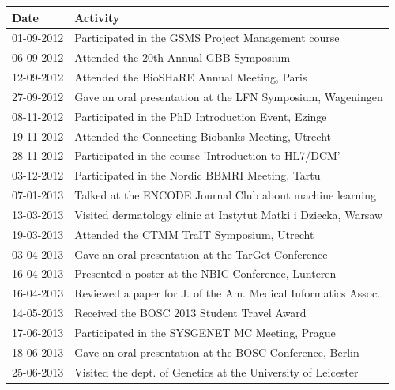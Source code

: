 \begin{appendices}
\begin{table}
\footnotesize
\begin{tabulary}{\linewidth}{LL}
  Date & Activity \\
  \hline
  \rule{0pt}{2.5ex}\mbox{01-09-2012} & Participated in the GSMS Project Management course \\
  \rule{0pt}{2.5ex}\mbox{06-09-2012} & Attended the 20th Annual GBB Symposium \\
  \rule{0pt}{2.5ex}\mbox{12-09-2012} & Attended the BioSHaRE Annual Meeting, Paris \\
  \rule{0pt}{2.5ex}\mbox{27-09-2012} & Gave an oral presentation at the LFN Symposium, Wageningen \\
  \rule{0pt}{2.5ex}\mbox{08-11-2012} & Participated in the PhD Introduction Event, Ezinge \\
  \rule{0pt}{2.5ex}\mbox{19-11-2012} & Attended the Connecting Biobanks Meeting, Utrecht \\
  \rule{0pt}{2.5ex}\mbox{28-11-2012} & Participated in the course 'Introduction to HL7/DCM' \\
  \rule{0pt}{2.5ex}\mbox{03-12-2012} & Participated in the Nordic BBMRI Meeting, Tartu \\
  \rule{0pt}{2.5ex}\mbox{07-01-2013} & Talked at the ENCODE Journal Club about machine learning\\
  \rule{0pt}{2.5ex}\mbox{13-03-2013} & Visited dermatology clinic at Instytut Matki i Dziecka, Warsaw \\
  \rule{0pt}{2.5ex}\mbox{19-03-2013} & Attended the CTMM TraIT Symposium, Utrecht \\
  \rule{0pt}{2.5ex}\mbox{03-04-2013} & Gave an oral presentation at the TarGet Conference \\
  \rule{0pt}{2.5ex}\mbox{16-04-2013} & Presented a poster at the NBIC Conference, Lunteren \\
  \rule{0pt}{2.5ex}\mbox{16-04-2013} & Reviewed a paper for J. of the Am. Medical Informatics Assoc.  \\
  \rule{0pt}{2.5ex}\mbox{14-05-2013} & Received the BOSC 2013 Student Travel Award \\
  \rule{0pt}{2.5ex}\mbox{17-06-2013} & Participated in the SYSGENET MC Meeting, Prague \\
  \rule{0pt}{2.5ex}\mbox{18-06-2013} & Gave an oral presentation at the BOSC Conference, Berlin \\
  \rule{0pt}{2.5ex}\mbox{25-06-2013} & Visited the dept. of Genetics at the University of Leicester \\

\end{tabulary}
\end{table}
\end{appendices}
